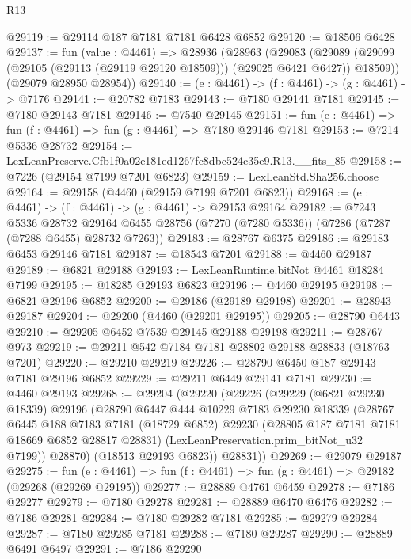 \begin{lexlean}{R13}
\begin{coremodule}
@29119 := @29114 @187 @7181 @7181 @6428 @6852
@29120 := @18506 @6428
@29137 := fun (value : @4461) =>
  @28936
    (@28963
      (@29083
        (@29089 (@29099 (@29105 (@29113 (@29119 @29120 @18509))) (@29025 @6421 @6427)) @18509))
      (@29079 @28950 @28954))
@29140 := (e : @4461) -> (f : @4461) -> (g : @4461) -> @7176
@29141 := @20782 @7183
@29143 := @7180 @29141 @7181
@29145 := @7180 @29143 @7181
@29146 := @7540 @29145
@29151 := fun (e : @4461) => fun (f : @4461) => fun (g : @4461) => @7180 @29146 @7181
@29153 := @7214 @5336 @28732
@29154 := LexLeanPreserve.Cfb1f0a02e181ed1267fc8dbc524c35e9.R13.__fits_85
@29158 := @7226 (@29154 @7199 @7201 @6823)
@29159 := LexLeanStd.Sha256.choose
@29164 := @29158 (@4460 (@29159 @7199 @7201 @6823))
@29168 := (e : @4461) -> (f : @4461) -> (g : @4461) -> @29153 @29164
@29182 := @7243
    @5336
    @28732
    @29164
    @6455
    @28756
    (@7270 (@7280 @5336))
    (@7286 (@7287 (@7288 @6455) @28732 @7263))
@29183 := @28767 @6375
@29186 := @29183 @6453 @29146 @7181
@29187 := @18543 @7201
@29188 := @4460 @29187
@29189 := @6821 @29188
@29193 := LexLeanRuntime.bitNot @4461 @18284 @7199
@29195 := @18285 @29193 @6823
@29196 := @4460 @29195
@29198 := @6821 @29196 @6852
@29200 := @29186 (@29189 @29198)
@29201 := @28943 @29187
@29204 := @29200 (@4460 (@29201 @29195))
@29205 := @28790 @6443
@29210 := @29205 @6452 @7539 @29145 @29188 @29198
@29211 := @28767 @973
@29219 := @29211 @542 @7184 @7181 @28802 @29188 @28833 (@18763 @7201)
@29220 := @29210 @29219
@29226 := @28790 @6450 @187 @29143 @7181 @29196 @6852
@29229 := @29211 @6449 @29141 @7181
@29230 := @4460 @29193
@29268 := @29204
    (@29220
      (@29226
        (@29229
          (@6821 @29230 @18339)
          @29196
          (@28790
            @6447
            @444
            @10229
            @7183
            @29230
            @18339
            (@28767
              @6445
              @188
              @7183
              @7181
              (@18729 @6852)
              @29230
              (@28805 @187 @7181 @7181 @18669 @6852 @28817 @28831)
              (LexLeanPreservation.prim_bitNot_u32 @7199))
            @28870)
          (@18513 @29193 @6823))
        @28831))
@29269 := @29079 @29187
@29275 := fun (e : @4461) => fun (f : @4461) => fun (g : @4461) => @29182 (@29268 (@29269 @29195))
@29277 := @28889 @4761 @6459
@29278 := @7186 @29277
@29279 := @7180 @29278
@29281 := @28889 @6470 @6476
@29282 := @7186 @29281
@29284 := @7180 @29282 @7181
@29285 := @29279 @29284
@29287 := @7180 @29285 @7181
@29288 := @7180 @29287
@29290 := @28889 @6491 @6497
@29291 := @7186 @29290

\end{coremodule}
\end{lexlean}
